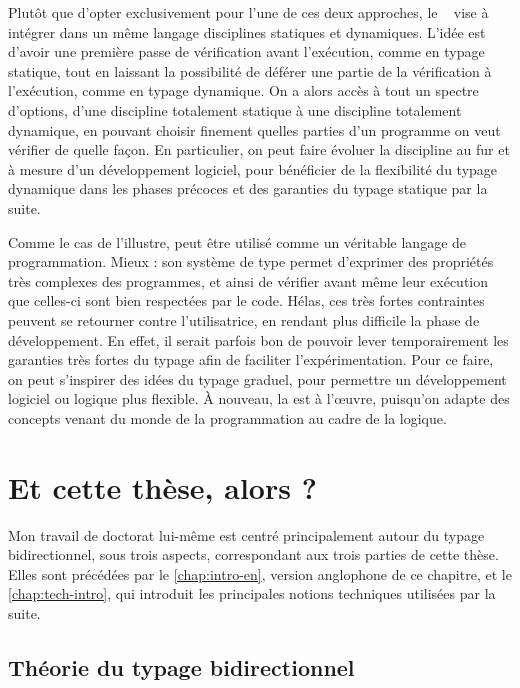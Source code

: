 Plutôt que d’opter exclusivement pour l’une de ces deux approches,
le ~ vise à intégrer
dans un même langage disciplines statiques et dynamiques.
L’idée est d’avoir une première passe de vérification avant l’exécution, comme en typage statique, tout en laissant la possibilité de déférer une partie de la vérification à l’exécution, comme en typage dynamique.
On a alors accès à tout un spectre d’options,
d’une discipline totalement statique à une discipline totalement dynamique,
en pouvant choisir finement quelles parties d’un programme on veut vérifier de quelle façon.
En particulier, on peut faire évoluer la discipline au fur et à mesure d’un développement
logiciel, pour bénéficier de la flexibilité du typage dynamique dans les phases précoces et des
garanties du typage statique par la suite.

Comme le cas de  l’illustre,  peut être utilisé comme un véritable langage
de programmation. Mieux : son système de type 
permet d’exprimer des propriétés très complexes des programmes, et ainsi de vérifier
avant même leur exécution que celles-ci sont bien respectées par le code.
Hélas, ces très fortes contraintes peuvent
se retourner contre l’utilisatrice, en rendant plus difficile la phase de développement.
En effet, il serait parfois bon de pouvoir lever temporairement
les garanties très fortes du typage afin de faciliter l’expérimentation.
Pour ce faire, on peut s’inspirer des idées du typage graduel, pour permettre un développement
logiciel ou logique plus flexible. À nouveau, la 
est à l’œuvre, puisqu’on adapte des concepts venant du monde de la programmation
au cadre de la logique.

\section{Et cette thèse, alors ?}
\label{sec:cette-these}

Mon travail de doctorat lui-même
est centré principalement autour du typage bidirectionnel, sous
trois aspects, correspondant aux trois parties de cette thèse.
Elles sont précédées par le \cref{chap:intro-en}, version anglophone
de ce chapitre, et le \cref{chap:tech-intro}, qui introduit les principales
notions techniques utilisées par la suite.

\subsection{Théorie du typage bidirectionnel}

